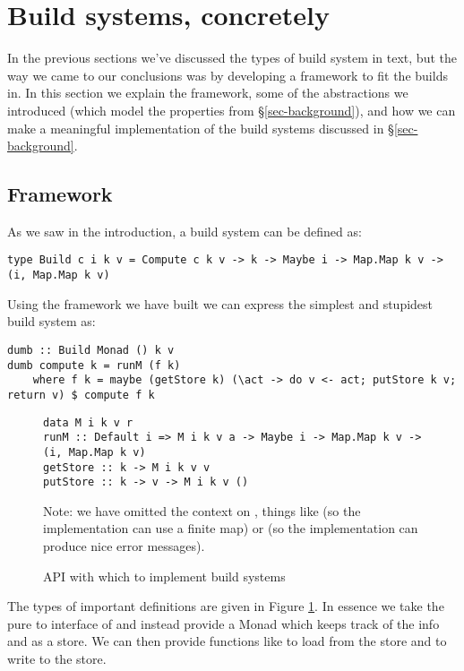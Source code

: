 \clearpage
\section{Build systems, concretely}\label{sec-implementations}

In the previous sections we've discussed the types of build system in text, but the way we came to our conclusions was by developing a framework to fit the builds in. In this section we explain the framework, some of the abstractions we introduced (which model the properties from \S\ref{sec-background}), and how we can make a meaningful implementation of the build systems discussed in \S\ref{sec-background}.

\subsection{Framework}

As we saw in the introduction, a build system can be defined as:

\begin{verbatim}
type Build c i k v = Compute c k v -> k -> Maybe i -> Map.Map k v -> (i, Map.Map k v)
\end{verbatim}

Using the framework we have built we can express the simplest and stupidest build system as:

\begin{verbatim}
dumb :: Build Monad () k v
dumb compute k = runM (f k)
    where f k = maybe (getStore k) (\act -> do v <- act; putStore k v; return v) $ compute f k
\end{verbatim}

\begin{figure}
\begin{verbatim}
data M i k v r
runM :: Default i => M i k v a -> Maybe i -> Map.Map k v -> (i, Map.Map k v)
getStore :: k -> M i k v v
putStore :: k -> v -> M i k v ()
\end{verbatim}
Note: we have omitted the context on , things like  (so the implementation can use a finite map) or  (so the implementation can produce nice error messages).
\caption{API with which to implement build systems}
\label{fig-M-api}
\end{figure}

The types of important definitions are given in Figure \ref{fig-M-api}. In essence we take the pure  to  interface of  and instead provide a Monad  which keeps track of the  info and  as a store. We can then provide functions like  to load from the store and  to write to the store.

